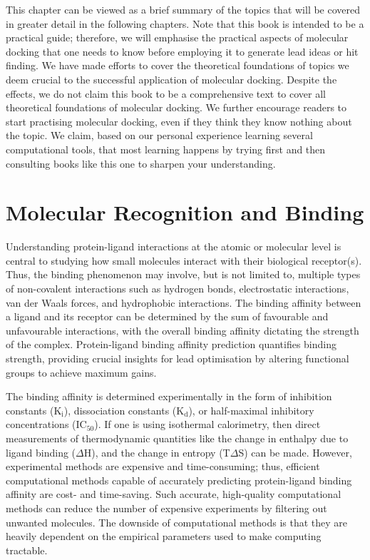 \documentclass[12pt]{article}
\begin{document}
This chapter can be viewed as a brief summary of the topics that will be covered in greater detail in the following chapters. Note that this book is intended to be a practical guide; therefore, we will emphasise the practical aspects of molecular docking that one needs to know before employing it to generate lead ideas or hit finding. We have made efforts to cover the theoretical foundations of topics we deem crucial to the successful application of molecular docking. Despite the effects, we do not claim this book to be a comprehensive text to cover all theoretical foundations of molecular docking. We further encourage readers to start practising molecular docking, even if they think they know nothing about the topic. We claim, based on our personal experience learning several computational tools, that most learning happens by trying first and then consulting books like this one to sharpen your understanding. 



\section{Molecular Recognition and Binding}

Understanding protein-ligand interactions at the atomic or molecular level is central to studying how small molecules interact with their biological receptor(s). Thus, the binding phenomenon may involve, but is not limited to, multiple types of non-covalent interactions such as hydrogen bonds, electrostatic interactions, van der Waals forces, and hydrophobic interactions. The binding affinity between a ligand and its receptor can be determined by the sum of favourable and unfavourable interactions, with the overall binding affinity dictating the strength of the complex. Protein-ligand binding affinity prediction quantifies binding strength, providing crucial insights for lead optimisation by altering functional groups to achieve maximum gains\cite {CH1_13}. 



The binding affinity is determined experimentally in the form of inhibition constants (K$_\text{i}$), dissociation constants (K$_\text{d}$), or half-maximal inhibitory concentrations (IC$_\text{50}$). If one is using isothermal calorimetry, then direct measurements of thermodynamic quantities like the change in enthalpy due to ligand binding ({$\Delta$}H), and the change in entropy (T{$\Delta$}S) can be made. However, experimental methods are expensive and time-consuming; thus, efficient computational methods capable of accurately predicting protein-ligand binding affinity are cost- and time-saving. Such accurate, high-quality computational methods can reduce the number of expensive experiments by filtering out unwanted molecules. The downside of computational methods is that they are heavily dependent on the empirical parameters used to make computing tractable.
\end{document}
